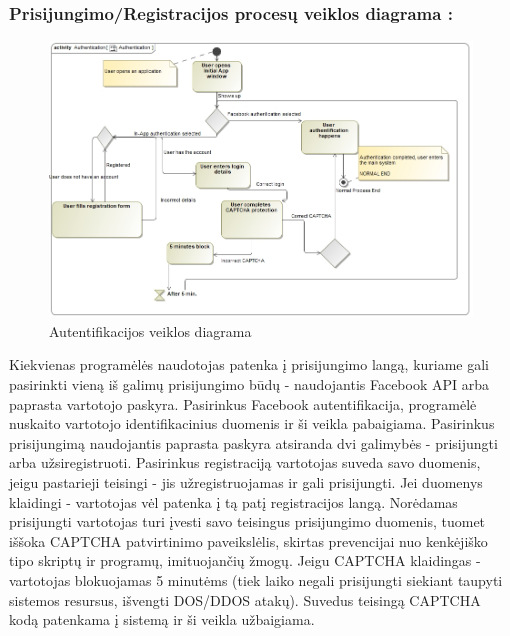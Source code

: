 \documentclass{VUMIFPSkursinis}
\begin{document}
		\subsubsection*{Prisijungimo/Registracijos procesų veiklos diagrama :}
		\begin{figure}[H]
			\centering
			\includegraphics[scale=0.5]{img/Authentication}
			\caption{Autentifikacijos veiklos diagrama}
			\label{img:Authentication}
		\end{figure}
		Kiekvienas programėlės naudotojas patenka į prisijungimo langą, kuriame gali 			pasirinkti vieną iš galimų prisijungimo būdų - naudojantis Facebook API arba 			paprasta vartotojo paskyra. Pasirinkus Facebook autentifikacija, programėlė 			nuskaito vartotojo identifikacinius duomenis ir ši veikla pabaigiama. Pasirinkus 			prisijungimą naudojantis paprasta paskyra atsiranda dvi galimybės - prisijungti 		arba užsiregistruoti. Pasirinkus registraciją vartotojas suveda savo duomenis, 			jeigu pastarieji teisingi - jis užregistruojamas ir gali prisijungti. Jei duomenys 			klaidingi - vartotojas vėl patenka į tą patį registracijos langą. Norėdamas 			prisijungti vartotojas turi įvesti savo teisingus prisijungimo duomenis, tuomet 		iššoka CAPTCHA patvirtinimo paveikslėlis, skirtas prevencijai nuo kenkėjiško tipo 			skriptų ir programų, imituojančių žmogų. Jeigu CAPTCHA klaidingas - vartotojas 			blokuojamas 5 minutėms (tiek laiko negali prisijungti siekiant taupyti sistemos 		resursus, išvengti DOS/DDOS atakų). Suvedus teisingą CAPTCHA kodą patenkama į 			sistemą ir ši veikla užbaigiama.
\end{document}
